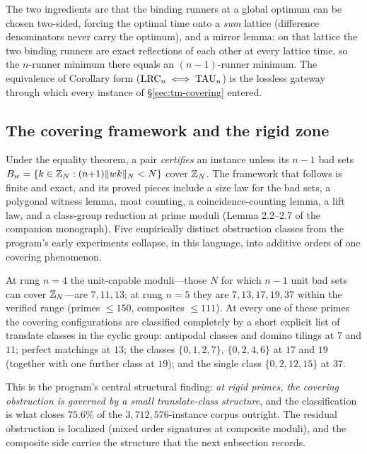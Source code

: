 The two ingredients are that the binding runners at a global optimum can
be chosen two-sided, forcing the optimal time onto a \emph{sum} lattice
(difference denominators never carry the optimum), and a mirror lemma:
on that lattice the two binding runners are exact reflections of each
other at every lattice time, so the $n$-runner minimum there equals an
$(n-1)$-runner minimum. The equivalence of Corollary form
($\mathrm{LRC}_n\iff\mathrm{TAU}_n$) is the lossless gateway through which every
instance of \S\ref{sec:tm-covering} entered.

\subsection{The covering framework and the rigid zone}

Under the equality theorem, a pair \emph{certifies} an instance unless
its $n-1$ bad sets $B_w=\{k\in\mathbb{Z}_N:(n{+}1)\lVert wk \rVert_{N}<N\}$ cover $\mathbb{Z}_N$.
The framework that follows is finite and exact, and its proved pieces
include a size law for the bad sets, a polygonal witness lemma, moat
counting, a coincidence-counting lemma, a lift law, and a class-group
reduction at prime moduli (Lemma 2.2--2.7 of the companion
monograph). Five empirically distinct obstruction classes from the
program's early experiments collapse, in this language, into additive
orders of one covering phenomenon.

\begin{theorem}\label{thm:rigid}
At rung $n=4$ the unit-capable moduli---those $N$ for which $n-1$ unit
bad sets can cover $\mathbb{Z}_N$---are $7,11,13$; at rung $n=5$ they are
$7,13,17,19,37$ within the verified range (primes $\le150$, composites
$\le111$). At every one of these primes the covering configurations are
classified completely by a short explicit list of translate classes in
the cyclic group: antipodal classes and domino tilings at $7$ and $11$;
perfect matchings at $13$; the classes $\{0,1,2,7\}$, $\{0,2,4,6\}$ at
$17$ and $19$ (together with one further class at $19$); and the single
class $\{0,2,12,15\}$ at $37$.
\end{theorem}

This is the program's central structural finding: \emph{at rigid primes,
the covering obstruction is governed by a small translate-class
structure}, and the classification is what closes $75.6\%$ of the
$3{,}712{,}576$-instance corpus outright. The residual obstruction is
localized (mixed order signatures at composite moduli), and the composite
side carries the structure that the next subsection records.

